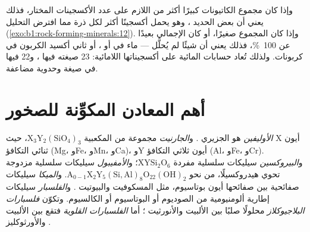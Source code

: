 وإذا كان مجموع الكاتيونات كبيرًا أكثر من اللازم على عدد الأكسجينات المختار، فذلك يعني أن بعض الحديد ، وهو يحمل أكسجينًا أكثر لكل ذرة مما افترض التحليل (\cref{exo:b1:rock-forming-minerals:12}). وإذا كان المجموع صغيرًا، أو كان الإجمالي بعيدًا عن \qty{100}{\percent}، فذلك يعني أن شيئًا لم يُحلَّل --- ماء في  أو ، أو ثاني أكسيد الكربون في كربونات. ولذلك تُعاد حسابات  المائية على أكسجيناتها اللامائية: 23  صيغته فيها ، و\num{22}  فيها  في صيغة وحدوية مضاعفة.

\section{أهم المعادن المكوِّنة للصخور}

\begin{definition}\label{def:b1:rock-forming-minerals:groups}
\emph{الأوليفين} هو  الجزيري . و\emph{الجارنيت} مجموعة من  المكعبية $\mathrm{X_3Y_2(SiO_4)_3}$، حيث X أيون ثنائي التكافؤ (Mg، وFe، وMn، وCa)، وY أيون ثلاثي التكافؤ (Al، وFe، وCr). و\emph{البيروكسين} سيليكات سلسلية مفردة $\mathrm{XYSi_2O_6}$؛ و\emph{الأمفيبول} سيليكات سلسلية مزدوجة تحوي هيدروكسيلًا، من نحو $\mathrm{A_{0-1}X_2Y_5(Si,Al)_8O_{22}(OH)_2}$. و\emph{الميكا} سيليكات صفائحية بين صفائحها أيون بوتاسيوم، مثل المسكوفيت  والبيوتيت . و\emph{الفلسبار} سيليكات إطارية ألومنيومية من الصوديوم أو البوتاسيوم أو الكالسيوم. وتكوّن \emph{فلسبارات البلاجيوكلاز} محلولًا صلبًا بين الألبيت  والأنورثيت ؛ أما \emph{الفلسبارات القلوية} فتقع بين الألبيت والأورثوكليز .
\end{definition}

